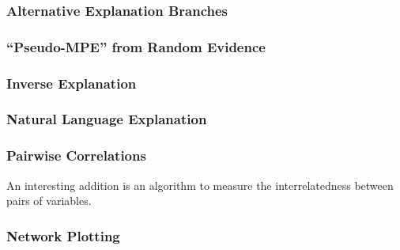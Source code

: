 \subsubsection{Alternative Explanation Branches}

\subsubsection{\enquote{Pseudo-MPE} from Random Evidence} \label{subsubsec: pseudo-mpe-random}

\subsubsection{Inverse Explanation}

\subsubsection{Natural Language Explanation}

\subsubsection{Pairwise Correlations}
An interesting addition is an algorithm to measure the interrelatedness between pairs of variables.

\subsubsection{Network Plotting} \label{subsubsec:plot-model}


